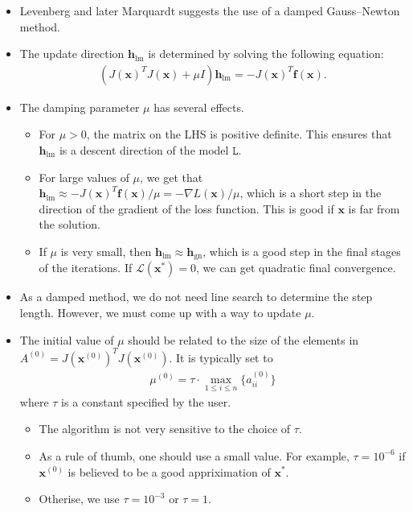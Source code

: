 \documentclass[10pt]{article}
\newcommand{\ve}[1]{\mathbf{#1}}
\newcommand{\mrm}[1]{\mathrm{#1}}
\newcommand{\mcal}[1]{\mathcal{#1}}
\begin{document}
\begin{itemize}
    \item Levenberg \cite{Levenberg:1944} and later Marquardt \cite{Marquadrt:1963} suggests the use of a damped Gauss--Newton method.
    
    \item The update direction $\ve{h}_{\mrm{lm}}$ is determined by solving the following equation:
    \begin{align*}
        (J(\ve{x})^TJ(\ve{x}) + \mu I) \ve{h}_{\mrm{lm}} = - J(\ve{x})^T \ve{f}(\ve{x}).
    \end{align*}

    \item The damping parameter $\mu$ has several effects.
    \begin{itemize}
        \item For $\mu > 0$, the matrix on the LHS is positive definite. This ensures that $\ve{h}_{\mrm{lm}}$ is a descent direction of the model $\mathtt{L}$.
        
        \item For large values of $\mu$, we get that $\ve{h}_{\mrm{lm}} \approx - J(\ve{x})^T \ve{f}(\ve{x}) / \mu = - \nabla{L}(\ve{x})/\mu$, which is a short step in the direction of the gradient of the loss function. This is good if $\ve{x}$ is far from the solution.
        
        \item If $\mu$ is very small, then $\ve{h}_{\mrm{lm}} \approx \ve{h}_{\mrm{gn}}$, which is a good step in the final stages of the iterations. If $\mcal{L}(\ve{x}^*) = 0$, we  can get quadratic final convergence.
    \end{itemize}

    \item As a damped method, we do not need line search to determine the step length. However, we must come up with a way to update $\mu$.
    
    \item The initial value of $\mu$ should be related to the size of the elements in $A^{(0)} = J(\ve{x}^{(0)})^T J(\ve{x}^{(0)})$. It is typically set to
    \begin{align*}
        \mu^{(0)} = \tau \cdot \max_{1 \leq i \leq n} \{ a^{(0)}_{ii} \} 
    \end{align*}
    where $\tau$ is a constant specified by the user.
    \begin{itemize}
        \item The algorithm is not very sensitive to the choice of $\tau$.
        \item As a rule of thumb, one should use a small value. For example, $\tau = 10^{-6}$ if $\ve{x}^{(0)}$ is believed to be a good appriximation of $\ve{x}^*$.
        \item Otherise, we use $\tau = 10^{-3}$ or $\tau = 1$.
    \end{itemize}


\end{itemize}
\end{document}
